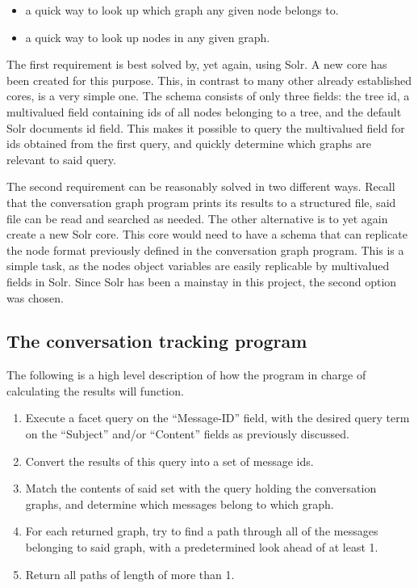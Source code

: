 \documentclass[a4paper,english]{report}
\begin{document}
\begin{itemize}
\item a quick way to look up which graph any given node belongs to. 
\item a quick way to look up nodes in any given graph. 
\end{itemize}


The first requirement is best solved by, yet again, using Solr. A new core has been created for this purpose. This, in contrast to many other already established cores, is a very simple one. The schema consists of only three fields: the tree id, a multivalued field containing ids of all nodes belonging to a tree, and the default Solr documents id field. This makes it possible to query the multivalued field for ids obtained from the first query, and quickly determine which graphs are relevant to said query.


The second requirement can be reasonably solved in two different ways. Recall that the conversation graph program prints its results to a structured file, said file can be read and searched as needed. The other alternative is to yet again create a new Solr core. This core would need to have a schema that can replicate the node format previously defined in the conversation graph program. This is a simple task, as the nodes object variables are easily replicable by multivalued fields in Solr. Since Solr has been a mainstay in this project, the second option was chosen.


\subsection{The conversation tracking program}


The following is a high level description of how the program in charge of calculating the results will function.


\begin{enumerate}

\item Execute a facet query on the “Message-ID” field, with the desired query term on the “Subject” and/or “Content” fields as previously discussed.
\item Convert the results of this query into a set of message ids.
\item Match the contents of said set with the query holding the conversation graphs, and determine which messages belong to which graph.
\item For each returned graph, try to find a path through all of the messages belonging to said graph, with a predetermined look ahead of at least 1. 
\item Return all paths of length of more than 1.


\end{enumerate}
\end{document}
